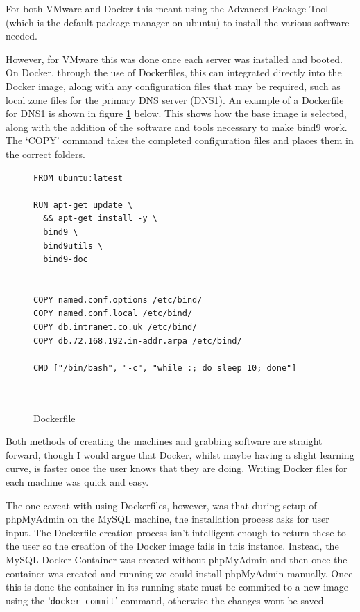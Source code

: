 For both VMware and Docker this meant using the Advanced Package Tool (which is the default package manager on ubuntu) to install the various software needed.

However, for VMware this was done once each server was installed and booted. On Docker, through the use of Dockerfiles, this can integrated directly into the Docker image, along with any configuration files that may be required, such as local zone files for the primary DNS server (DNS1). An example of a Dockerfile for DNS1 is shown in figure \ref{fig:dockerfileexample} below. This shows how the base image is selected, along with the addition of the software and tools necessary to make bind9 work. The `COPY' command takes the completed configuration files and places them in the correct folders.
\begin{figure}[h]
\caption{Dockerfile}
\label{fig:dockerfileexample}
\begin{verbatim}
FROM ubuntu:latest

RUN apt-get update \
  && apt-get install -y \
  bind9 \
  bind9utils \
  bind9-doc


COPY named.conf.options /etc/bind/
COPY named.conf.local /etc/bind/
COPY db.intranet.co.uk /etc/bind/
COPY db.72.168.192.in-addr.arpa /etc/bind/

CMD ["/bin/bash", "-c", "while :; do sleep 10; done"]



\end{verbatim}

\end{figure}

Both methods of creating the machines and grabbing software are straight forward, though I would argue that Docker, whilst maybe having a slight learning curve, is faster once the user knows that they are doing. Writing Docker files for each machine was quick and easy.

The one caveat with using Dockerfiles, however, was that during setup of phpMyAdmin on the MySQL machine, the installation process asks for user input. The Dockerfile creation process isn't intelligent enough to return these to the user so the creation of the Docker image fails in this instance. Instead, the MySQL Docker Container was created without phpMyAdmin and then once the container was created and running we could install phpMyAdmin manually. Once this is done the container in its running state must be commited to a new image using the '\texttt{docker commit}' command\citep{DockerCommit}, otherwise the changes wont be saved.


